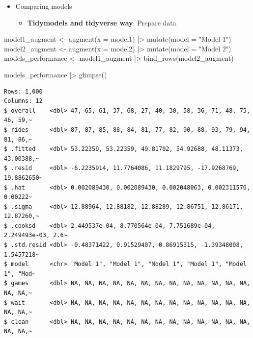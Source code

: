 \documentclass[
  ignorenonframetext,
]{beamer}
\newenvironment{Shaded}{\begin{snugshade}}{\end{snugshade}}
\newcommand{\AttributeTok}[1]{\textcolor[rgb]{0.40,0.45,0.13}{#1}}
\newcommand{\FunctionTok}[1]{\textcolor[rgb]{0.28,0.35,0.67}{#1}}
\newcommand{\NormalTok}[1]{\textcolor[rgb]{0.00,0.23,0.31}{#1}}
\newcommand{\OtherTok}[1]{\textcolor[rgb]{0.00,0.23,0.31}{#1}}
\newcommand{\SpecialCharTok}[1]{\textcolor[rgb]{0.37,0.37,0.37}{#1}}
\newcommand{\StringTok}[1]{\textcolor[rgb]{0.13,0.47,0.30}{#1}}
\providecommand{\tightlist}{%
  \setlength{\itemsep}{0pt}\setlength{\parskip}{0pt}}\usepackage{longtable,booktabs,array}
\begin{document}
\begin{frame}[fragile]{}
\label{section-27}
\begin{itemize}
\item
  Comparing models

  \begin{itemize}
  \tightlist
  \item
    \textbf{Tidymodels and tidyverse way}: Prepare data
  \end{itemize}
\end{itemize}

\tiny

\begin{Shaded}
\begin{Highlighting}[]
\NormalTok{model1\_augment }\OtherTok{\textless{}{-}} \FunctionTok{augment}\NormalTok{(}\AttributeTok{x =}\NormalTok{ model1) }\SpecialCharTok{|\textgreater{}} \FunctionTok{mutate}\NormalTok{(}\AttributeTok{model =} \StringTok{"Model 1"}\NormalTok{)}
\NormalTok{model2\_augment }\OtherTok{\textless{}{-}} \FunctionTok{augment}\NormalTok{(}\AttributeTok{x =}\NormalTok{ model2) }\SpecialCharTok{|\textgreater{}} \FunctionTok{mutate}\NormalTok{(}\AttributeTok{model =} \StringTok{"Model 2"}\NormalTok{)}
\NormalTok{models\_performance }\OtherTok{\textless{}{-}}\NormalTok{ model1\_augment }\SpecialCharTok{|\textgreater{}} \FunctionTok{bind\_rows}\NormalTok{(model2\_augment)}

\NormalTok{models\_performance }\SpecialCharTok{|\textgreater{}} \FunctionTok{glimpse}\NormalTok{()}
\end{Highlighting}
\end{Shaded}

\begin{verbatim}
Rows: 1,000
Columns: 12
$ overall    <dbl> 47, 65, 61, 37, 68, 27, 40, 30, 58, 36, 71, 48, 75, 46, 59,~
$ rides      <dbl> 87, 87, 85, 88, 84, 81, 77, 82, 90, 88, 93, 79, 94, 81, 86,~
$ .fitted    <dbl> 53.22359, 53.22359, 49.81702, 54.92688, 48.11373, 43.00388,~
$ .resid     <dbl> -6.2235914, 11.7764086, 11.1829795, -17.9268769, 19.8862650~
$ .hat       <dbl> 0.002089430, 0.002089430, 0.002048063, 0.002311576, 0.00222~
$ .sigma     <dbl> 12.88964, 12.88182, 12.88289, 12.86751, 12.86171, 12.87260,~
$ .cooksd    <dbl> 2.449537e-04, 8.770564e-04, 7.751689e-04, 2.249493e-03, 2.6~
$ .std.resid <dbl> -0.48371422, 0.91529407, 0.86915315, -1.39348008, 1.5457218~
$ model      <chr> "Model 1", "Model 1", "Model 1", "Model 1", "Model 1", "Mod~
$ games      <dbl> NA, NA, NA, NA, NA, NA, NA, NA, NA, NA, NA, NA, NA, NA, NA,~
$ wait       <dbl> NA, NA, NA, NA, NA, NA, NA, NA, NA, NA, NA, NA, NA, NA, NA,~
$ clean      <dbl> NA, NA, NA, NA, NA, NA, NA, NA, NA, NA, NA, NA, NA, NA, NA,~
\end{verbatim}
\end{frame}
\end{document}
